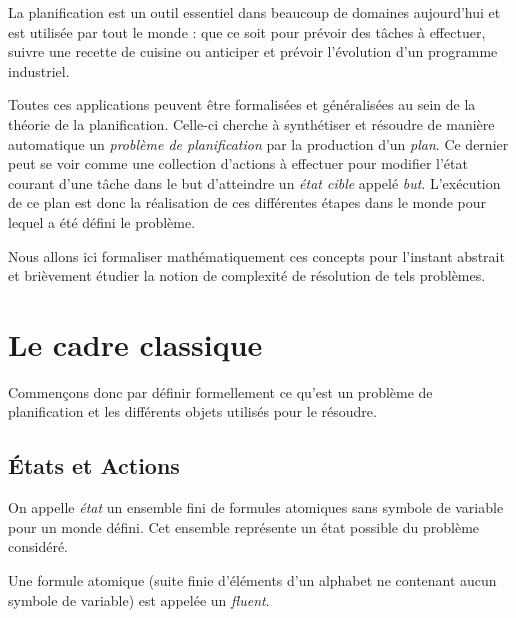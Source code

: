 \minitoc 


La planification est un outil essentiel dans beaucoup de domaines aujourd'hui et est utilisée par tout le monde : que ce soit pour prévoir des tâches à effectuer, suivre une recette de cuisine ou anticiper et prévoir l'évolution d'un programme industriel. 

Toutes ces applications peuvent être formalisées et généralisées au sein de la théorie de la planification. Celle-ci cherche à synthétiser et résoudre de manière automatique un \emph{problème de planification} par la production d'un \emph{plan}. Ce dernier peut se voir comme une collection d'actions à effectuer pour modifier l'état courant d'une tâche dans le but d'atteindre un \emph{état cible} appelé \emph{but}. L'exécution de ce plan est donc la réalisation de ces différentes étapes dans le monde pour lequel a été défini le problème. 

Nous allons ici formaliser mathématiquement ces concepts pour l'instant abstrait et brièvement étudier la notion de complexité de résolution de tels problèmes. 


\section{Le cadre classique}

Commençons donc par définir formellement ce qu'est un problème de planification et les différents objets utilisés pour le résoudre. 

\subsection{États et Actions}

\begin{definition}
    On appelle \emph{état} un ensemble fini de formules atomiques sans symbole de variable pour un monde défini. Cet ensemble représente un état possible du problème considéré. 

    Une formule atomique (suite finie d'éléments d'un alphabet ne contenant aucun symbole de variable) est appelée un \emph{fluent}. 
\end{definition}

